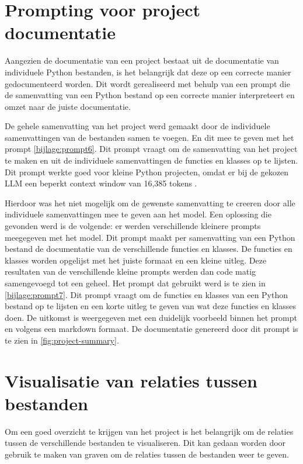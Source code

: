 \section{Prompting voor project documentatie}
\label{sec:project-documentatie-prompting}

Aangezien de documentatie van een project bestaat uit de documentatie van individuele Python bestanden, is het belangrijk dat deze op een correcte manier gedocumenteerd worden.
Dit wordt gerealiseerd met behulp van een prompt die de samenvatting van een Python bestand op een correcte manier interpreteert en omzet naar de juiste documentatie.

De gehele samenvatting van het project werd gemaakt door de individuele samenvattingen van de bestanden samen te voegen. 
En dit mee te geven met het prompt \ref{bijlage:prompt6}.
Dit prompt vraagt om de samenvatting van het project te maken en uit de individuele samenvattingen de functies en klasses op te lijsten.
Dit prompt werkte goed voor kleine Python projecten, omdat er bij de gekozen LLM een beperkt context window van 16,385 tokens \textcite{OpenAI}.

Hierdoor was het niet mogelijk om de gewenste samenvatting te creeren door alle individuele samenvattingen mee te geven aan het model.
Een oplossing die gevonden werd is de volgende: er werden verschillende kleinere prompts meegegeven met het model.
Dit prompt maakt per samenvatting van een Python bestand de documentatie van de verschillende functies en klasses. 
De functies en klasses worden opgelijst met het juiste formaat en een kleine uitleg.
Deze resultaten van de verschillende kleine prompts werden dan code matig samengevoegd tot een geheel. 
Het prompt dat gebruikt werd is te zien in \ref{bijlage:prompt7}.
Dit prompt vraagt om de functies en klasses van een Python bestand op te lijsten en een korte uitleg te geven van wat deze functies en klasses doen.
De uitkomst is weergegeven met een duidelijk voorbeeld binnen het prompt en volgens een markdown formaat. 
De documentatie genereerd door dit prompt is te zien in \ref{fig:project-summary}.

\section{Visualisatie van relaties tussen bestanden}
\label{sec:project-documentatie-relaties}

Om een goed overzicht te krijgen van het project is het belangrijk om de relaties tussen de verschillende bestanden te visualiseren.
Dit kan gedaan worden door gebruik te maken van graven om de relaties tussen de bestanden weer te geven.

